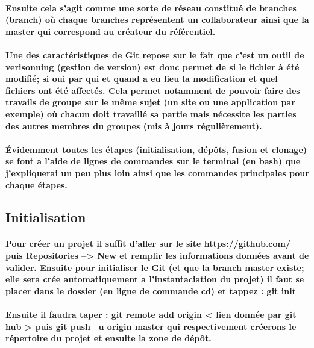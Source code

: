 \documentclass[a4paper, 12pt, twoside]{article}
\begin{document}
\paragraph{Ensuite cela s'agit comme une sorte de réseau constitué de branches (branch) où chaque branches représentent un collaborateur ainsi que la master qui correspond au créateur du référentiel.}

\paragraph{Une des caractéristiques de Git repose sur le fait que c'est un outil de verisonning (gestion de version) est donc permet de si le fichier
à été modifié; si oui par qui et quand a eu lieu la modification et quel fichiers ont été affectés. Cela permet notamment de pouvoir faire
des travails de groupe sur le même sujet (un site ou une application par exemple) où chacun doit travaillé sa partie mais nécessite les parties 
des autres membres du groupes (mis à jours régulièrement). }

\paragraph{Évidemment toutes les étapes (initialisation, dépôts, fusion et clonage) se font a l'aide de lignes de commandes sur le terminal (en bash) que j'expliquerai un peu plus loin ainsi que les commandes principales pour chaque étapes.}

\subsection{Initialisation}
\paragraph{ Pour créer un projet il suffit d'aller sur le site  https://github.com/ puis Repositories --> New et remplir les informations données avant
de valider. Ensuite pour initialiser le Git (et que la branch master existe; elle sera crée automatiquement a l'instantaciation du projet) il faut se placer dans le dossier (en ligne de commande cd) et tappez :  git init}

\paragraph{Ensuite  il faudra taper :  git remote add origin < lien donnée par git hub >  puis  git push –u origin master  qui respectivement créerons le répertoire du projet et ensuite la zone de dépôt.}
\end{document}
